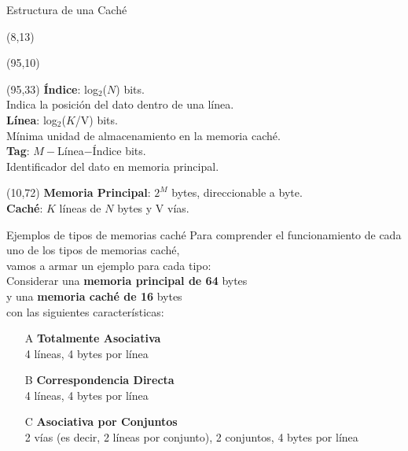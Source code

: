 \documentclass[aspectratio=169]{beamer}
\begin{document}
\begin{frame}{Estructura de una Caché}
    \begin{textblock}{80}(8,13)  \end{textblock}
    \begin{textblock}{80}(95,10)  \end{textblock}
    \begin{textblock}{55}(95,33)
    \normalsize \textbf{Índice}: \small \textcolor{naranjauca}{log$_2$($N$)} bits.\\
    \normalsize Indica la posición del dato dentro de una línea.\\
    \vskip 10pt
    \normalsize \textbf{Línea}: \small \textcolor{naranjauca}{log$_2$($K$/V)} bits.\\
    \normalsize Mínima unidad de almacenamiento en la memoria caché.\\
    \vskip 10pt
    \normalsize \textbf{Tag}: \small \textcolor{naranjauca}{$M-$Línea$-$Índice} bits.\\
    \normalsize Identificador del dato en memoria principal.\\
    \end{textblock}
    \begin{textblock}{80}(10,72)
    \textbf{Memoria Principal}: \textcolor{naranjauca}{$2^{M}$} bytes, direccionable a byte.\\
    \textbf{Caché}: \textcolor{naranjauca}{$K$} l\'ineas de \textcolor{naranjauca}{$N$} bytes y \textcolor{naranjauca}{V} vías.
    \end{textblock}
\end{frame}

\begin{frame}[fragile,t]{Ejemplos de tipos de memorias caché}
    Para comprender el funcionamiento de cada uno de los tipos de memorias caché,\\
    vamos a armar un ejemplo para cada tipo:\\
    \bigskip
    Considerar una \textbf{memoria principal de 64} bytes\\
    y una \textbf{memoria caché de 16} bytes\\
    con las siguientes características:\\
    \vskip 5pt
    \begin{itemize}
    \item[A] \textcolor{naranjauca}{\textbf{Totalmente Asociativa}}\\ 4 líneas, 4 bytes por línea
    \vskip 10pt
    \item[B] \textcolor{naranjauca}{\textbf{Correspondencia Directa}}\\ 4 líneas, 4 bytes por línea
    \vskip 10pt
    \item[C] \textcolor{naranjauca}{\textbf{Asociativa por Conjuntos}}\\ 2 vías (es decir, 2 líneas por conjunto), 2 conjuntos, 4 bytes por línea
    \end{itemize}
\end{frame}
\end{document}
